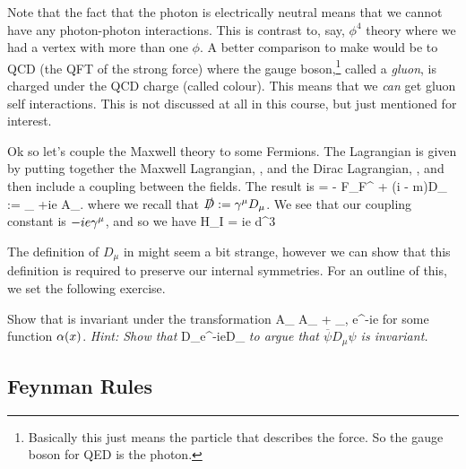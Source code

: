 \br 
    Note that the fact that the photon is electrically neutral means that we cannot have any photon-photon interactions. This is contrast to, say, $\phi^4$ theory where we had a vertex with more than one $\phi$. A better comparison to make would be to QCD (the QFT of the strong force) where the gauge boson,\footnote{Basically this just means the particle that describes the force. So the gauge boson for QED is the photon.} called a \textit{gluon}, is charged under the QCD charge (called colour). This means that we \textit{can} get gluon self interactions. This is not discussed at all in this course, but just mentioned for interest. 
\er 

Ok so let's couple the Maxwell theory to some Fermions. The Lagrangian is given by putting together the Maxwell Lagrangian, , and the Dirac Lagrangian, , and then include a coupling between the fields. The result is 
\be 
\label{eqn:QEDLagrangian}
    \cL = - F_{\mu\nu}F^{\mu\nu} + \overline{\psi}\big(i - m)\psi \qquad D_{\mu} := \p_{\mu} +ie A_{\mu}.
\ee 
where we recall that $\slashed{D} := \gamma^{\mu}D_{\mu}$. We see that our coupling constant is $-ie\gamma^{\mu}$, and so we have 
\be 
\label{eqn:HIQED}
    H_I = ie \int d^3  \, \overline{\psi}\psi
\ee 

\br 
    The definition of $D_{\mu}$ in  might seem a bit strange, however we can show that this definition is required to preserve our internal symmetries. For an outline of this, we set the following exercise.
\er 

\bbox 
    Show that  is invariant under the transformation 
    \bse 
        A_{\mu} \to A_{\mu} + \p_{\mu}\a, \qand \psi \to e^{-ie\a}\psi
    \ese
    for some function $\alpha(x)$. \textit{Hint: Show that}
    \bse 
        D_{\mu}\psi \to e^{-ie\a}D_{\mu}\psi
    \ese 
    \textit{to argue that $\overline{\psi}D_{\mu}\psi$ is invariant.}
\ebox  

\subsection{Feynman Rules}

